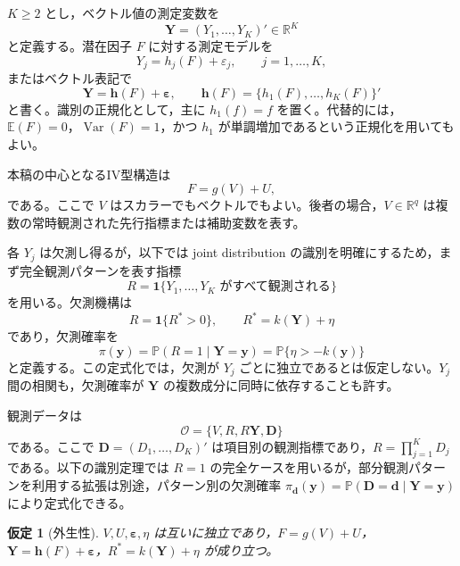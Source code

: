 \documentclass[dvipdfmx,autodetect-engine]{jsarticle}
\newtheorem{assumption}{仮定}
\newcommand{\E}{\mathbb{E}}
\newcommand{\Prb}{\mathbb{P}}
\newcommand{\R}{\mathbb{R}}
\newcommand{\1}{\mathbf{1}}
\newcommand{\calO}{\mathcal{O}}
\newcommand{\Y}{\bm{Y}}
\newcommand{\D}{\bm{D}}
\newcommand{\eps}{\bm{\varepsilon}}
\begin{document}
$K\geq 2$ とし，ベクトル値の測定変数を
\begin{equation}
  \Y=(Y_1,\ldots,Y_K)'\in\R^K
\end{equation}
と定義する。潜在因子 $F$ に対する測定モデルを
\begin{equation}
  Y_j=h_j(F)+\varepsilon_j,
  \qquad j=1,\ldots,K,
  \label{eq:vector-measurement}
\end{equation}
またはベクトル表記で
\begin{equation}
  \Y=\bm h(F)+\eps,
  \qquad \bm h(F)=\{h_1(F),\ldots,h_K(F)\}'
  \label{eq:vector-measurement-compact}
\end{equation}
と書く。識別の正規化として，主に $h_1(f)=f$ を置く。代替的には，$\E(F)=0$，$\operatorname{Var}(F)=1$，かつ $h_1$ が単調増加であるという正規化を用いてもよい。

本稿の中心となるIV型構造は
\begin{equation}
  F=g(V)+U,
  \label{eq:main-iv-structure}
\end{equation}
である。ここで $V$ はスカラーでもベクトルでもよい。後者の場合，$V\in\R^q$ は複数の常時観測された先行指標または補助変数を表す。

各 $Y_j$ は欠測し得るが，以下では joint distribution の識別を明確にするため，まず完全観測パターンを表す指標
\begin{equation}
  R=\1\{Y_1,\ldots,Y_K\text{ がすべて観測される}\}
\end{equation}
を用いる。欠測機構は
\begin{equation}
  R=\1\{R^*>0\},
  \qquad
  R^*=k(\Y)+\eta
  \label{eq:vector-y-missing}
\end{equation}
であり，欠測確率を
\begin{equation}
  \pi(\bm y)=\Prb(R=1\mid \Y=\bm y)
  =\Prb\{\eta>-k(\bm y)\}
  \label{eq:vector-pi}
\end{equation}
と定義する。この定式化では，欠測が $Y_j$ ごとに独立であるとは仮定しない。$Y_j$ 間の相関も，欠測確率が $\Y$ の複数成分に同時に依存することも許す。

観測データは
\begin{equation}
  \calO=\{V,R,R\Y,\D\}
  \label{eq:vector-observed-data}
\end{equation}
である。ここで $\D=(D_1,\ldots,D_K)'$ は項目別の観測指標であり，$R=\prod_{j=1}^K D_j$ である。以下の識別定理では $R=1$ の完全ケースを用いるが，部分観測パターンを利用する拡張は別途，パターン別の欠測確率 $\pi_{\bm d}(\bm y)=\Prb(\D=\bm d\mid \Y=\bm y)$ により定式化できる。

\begin{assumption}[外生性]
\label{ass:vector-exogeneity}
$V,U,\eps,\eta$ は互いに独立であり，$F=g(V)+U$，$\Y=\bm h(F)+\eps$，$R^*=k(\Y)+\eta$ が成り立つ。
\end{assumption}
\end{document}

